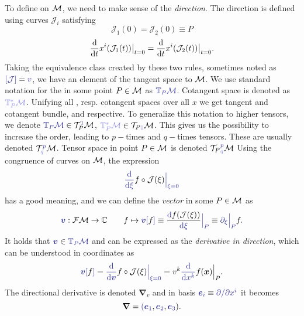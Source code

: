 To define  on $\mathcal{M}$, we need to make sense of the \emph{direction}. The direction is defined using curves $\mathcal J_i$ satisfying 
$$\mathcal J_1(0)=\mathcal J_2(0)\equiv P$$
$$\frac{\mathrm{d} }{\mathrm{d} t}x^i(\mathcal J_1(t))\big|_{t=0}=\frac{\mathrm{d} }{\mathrm{d} t}x^i(\mathcal J_2(t))\big|_{t=0}.$$
Taking the equivalence class created by these two rules, sometimes noted as $\bluee{[\mathcal J]}=\bluee v$, we have an element of the tangent space to $\mathcal{M}$. We use standard notation for the  in some point $P\in\mathcal{M}$ as $\bluee{\T_P\M}$. Cotangent space is denoted as $\blueee{\T^*_P\M}$. Unifying all , resp. cotangent spaces over all $x$ we get tangent and cotangent bundle, \bluee{$\TT\M$} and \blueee{$\TT^*\M$} respective. To generalize this notation to higher tensors, we denote $\bluee{\T_P\M}\in \TT_P^{\bluee{1}}\M$, $\blueee{\T^*_P\M}\in \TT_{P\blueee{1}}\M$. This gives us the possibility to increase the order, leading to $p-$times  and $q-$times  tensors. These are usually denoted $\TT^{\bluee p}_{\blueee q} \M$. Tensor space in point $P\in\mathcal{M}$ is denoted ${\TT_P}^{\bluee p}_{\blueee q} \M$
Using the congruence of curves on $\mathcal{M}$, the expression 
\begin{equation}
    \bluee{\der{}{\xi}}f\circ \mathcal J(\xi)\bluee{\Big|_{\xi=0}}
\end{equation}
has a good meaning, and we can define the \emph{vector} in some $P\in\mathcal{M}$ as
\begin{equation}
    \bluee{\bm v}: \FM\rightarrow \C \qquad f\mapsto \bluee{\bm v[}f\bluee ]\equiv \frac{\bluee \d f(\mathcal J(\xi))}{\bluee{\d \xi}}\bluee{\Big|_P} \equiv \bluee{\partial_\xi\Big|_P} f .
\end{equation}
It holds that $\bluee{\bm v}\in \bluee{\T_P\M}$ and can be expressed as the \emph{derivative in direction},
which can be understood in coordinates as
\begin{equation}
    \bluee{\bm v[}f\bluee ] = \bluee{\der{}{\bm v}} f\circ \mathcal J(\xi)\bluee{\Big|_{\xi=0}}=v^k\bluee{\der{}{x^k}} f(\bm x)\Big|_{P}.
\end{equation}
The directional derivative is denoted $\bm\nabla_v$
and in basis $\bluee{\bm e_i} \equiv \bluee{\partial/\partial x^i}$ it becomes
$$\bm\nabla=\bluee(\bluee{\bm e_1}, \bluee{\bm e_2},\bluee{\bm e_3}).$$


